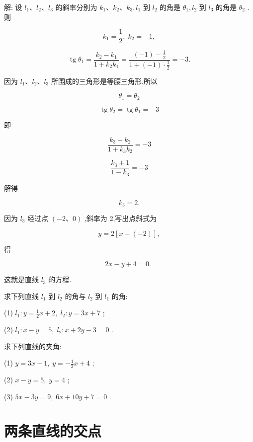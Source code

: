 \documentclass[lang=cn,newtx,12pt,scheme=chinese]{elegantbook}
\begin{document}
解: 设 \({l}_{1}\text{、}{l}_{2}\text{、}{l}_{3}\) 的斜率分别为 \({k}_{1}\text{、}{k}_{2}\text{、}{k}_{3},{l}_{1}\) 到 \({l}_{2}\) 的角是 \({\theta }_{1},{l}_{2}\) 到 \({l}_{3}\) 的角是 \({\theta }_{2}\) . 则

\[
    {k}_{1} = \frac{1}{2},\;{k}_{2} = - 1,
\]

\[
  \operatorname{tg}{\theta }_{1} = \frac{{k}_{2} - {k}_{1}}{1 + {k}_{2}{k}_{1}} = \frac{\left( {-1}\right) - \frac{1}{2}}{1 + \left( {-1}\right) \cdot \frac{1}{2}} = - 3.
\]

因为 \({l}_{1}\text{、}{l}_{2}\text{、}{l}_{3}\) 所围成的三角形是等腰三角形,所以

\[
    {\theta }_{1} = {\theta }_{2}
\]

\[
  \operatorname{tg}{\theta }_{2} = \operatorname{tg}{\theta }_{1} = - 3
\]

即

\[
  \frac{{k}_{3} - {k}_{2}}{1 + {k}_{3}{k}_{2}} = - 3
\]

\[
  \frac{{k}_{3} + 1}{1 - {k}_{3}} = - 3
\]

解得

\[
    {k}_{3} = 2\text{.}
\]

因为 \({l}_{3}\) 经过点 \(\left( {-2\text{、}0}\right)\) ,斜率为 2,写出点斜式为

\[
  y = 2\left\lbrack {x - \left( {-2}\right) }\right\rbrack ,
\]

得

\[
    {2x} - y + 4 = 0\text{. }
\]

这就是直线 \({l}_{3}\) 的方程.

\begin{problemset}[练习]

\item 求下列直线 \({l}_{1}\) 到 \({l}_{2}\) 的角与 \({l}_{2}\) 到 \({l}_{1}\) 的角:

(1) \({l}_{1} : y = \frac{1}{2}x + 2,\;{l}_{2} : y = {3x} + 7\) ;

(2) \({l}_{1} : x - y = 5,\;{l}_{2} : x + {2y} - 3 = 0\) .

\item 求下列直线的夹角:

(1) \(y = {3x} - 1,\;y = - \frac{1}{3}x + 4\) ;

(2) \(x - y = 5,\;y = 4\) ;

(3) \({5x} - {3y} = 9,\;{6x} + {10y} + 7 = 0\) .
\end{problemset}

\section{两条直线的交点}
\end{document}
